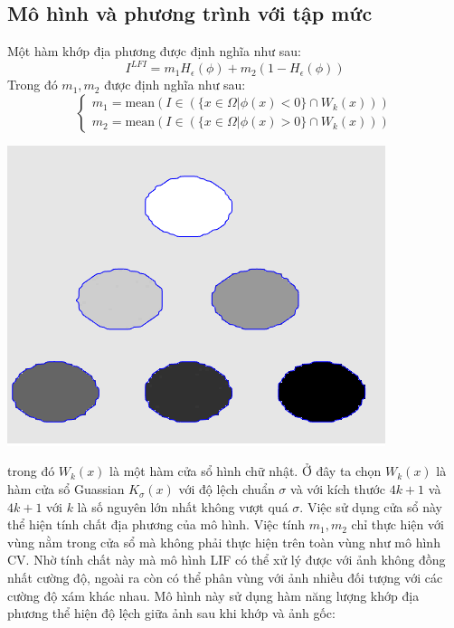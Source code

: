\documentclass[12pt, oneside, a4paper]{book}
\begin{document}
\subsection{Mô hình và phương trình với tập mức}
Một hàm khớp địa phương được định nghĩa như sau:
\begin{equation*}
I^{LFI}= m_1H_{\epsilon}(\phi)+m_2(1-H_{\epsilon}(\phi))
\end{equation*}
Trong đó $m_1,m_2$ được định nghĩa như sau:
\begin{equation*}
\begin{cases}
 m_1=\text{mean}(I\in (\{x\in \Omega|\phi(x)<0\}\cap W_k(x)))\\
  m_2=\text{mean}(I\in (\{x\in \Omega|\phi(x)>0\}\cap W_k(x)))
   \end{cases}
\end{equation*}
\begin{center}
\includegraphics[scale=.7]{figure/3clif1.png}
\end{center}
trong đó $W_k(x)$ là một hàm cửa sổ hình chữ nhật. Ở đây ta chọn $W_k(x)$  là hàm cửa sổ Guassian $K_{\sigma}(x)$ với độ lệch chuẩn $\sigma$ và với kích thước $4k+1$ và $4k+1$ với $k$ là số nguyên lớn nhất không vượt quá $\sigma$. Việc sử dụng cửa sổ này thể hiện tính chất địa phương của mô hình. Việc tính $m_1, m_2$ chỉ thực hiện với vùng nằm trong cửa sổ mà không phải thực hiện trên toàn vùng như mô hình CV. Nhờ tính chất này mà mô hình LIF có thể xử lý được với ảnh không đồng nhất cường độ, ngoài ra còn có thể phân vùng với ảnh nhiều đối tượng với các cường độ xám khác nhau. Mô hình này sử dụng hàm năng lượng khớp địa phương thể hiện độ lệch giữa ảnh sau khi khớp và ảnh gốc:
\end{document}
